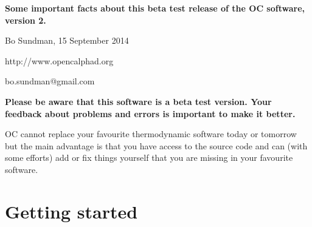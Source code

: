 \documentclass[12pt]{article}
\begin{document}
\begin{center}
{\Large \bf Some important facts about this beta test release of the
  OC software, version 2.}

Bo Sundman, 15 September 2014

http://www.opencalphad.org

bo.sundman@gmail.com
\end{center}

{\large \bf Please be aware that this software is a beta test version.
Your feedback about problems and errors is important to make it
better.}

OC cannot replace your favourite thermodynamic software today or
tomorrow but the main advantage is that you have access to the source
code and can (with some efforts) add or fix things yourself that you
are missing in your favourite software.

\section{Getting started}
\end{document}
